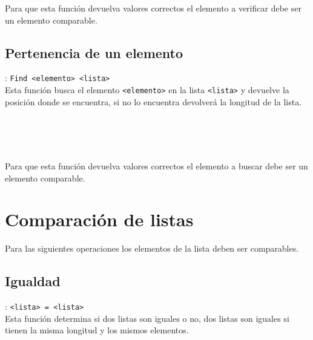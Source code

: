       Para que esta función devuelva valores correctos el elemento a verificar debe ser un elemento comparable.
      
      \subsection*{Pertenencia de un elemento}: \texttt{Find <elemento>~<lista>}\\
      Esta función busca el elemento \texttt{<elemento>} en la lista \texttt{<lista>} y devuelve la posición donde se encuentra, si no lo encuentra devolverá la longitud de la lista.
      
      \begin{fxcode}
         \\
         \\
         \\
         \outcode{[3]}
      \end{fxcode}
      
      Para que esta función devuelva valores correctos el elemento a buscar debe ser un elemento comparable.
      
   \section{Comparación de listas}
      Para las siguientes operaciones los elementos de la lista deben ser comparables.
      
      \subsection*{Igualdad}: \texttt{<lista>~= <lista>}\\
      Esta función determina si dos listas son iguales o no, dos listas son iguales si tienen la misma longitud y los mismos elementos.
      
      \begin{fxcode}
         \arrowcode{[1, 2] = []}\\
         \\
         \\
      \end{fxcode}
      
